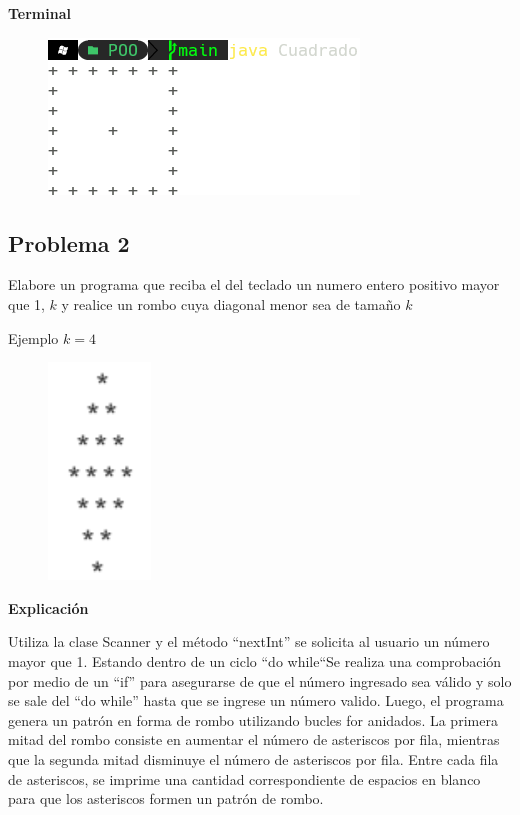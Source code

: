 \documentclass[11pt, twocolumn]{article}
\begin{document}
    \textbf{Terminal}
    \begin{figure}[ht]
        \includegraphics[width=0.75\columnwidth, center]{P1.png}
    \end{figure}


    \subsection*{Problema 2}
    Elabore un programa que reciba el del teclado un numero entero positivo mayor que 1, $k$ y realice un rombo cuya diagonal menor sea de tamaño $k$

    Ejemplo $k = 4$
    \begin{figure}[ht]
        \includegraphics[width=0.2\columnwidth, center]{Rombo.png}
    \end{figure}

    \textbf{Explicación} 

    Utiliza la clase Scanner y el método ``nextInt'' se solicita al usuario un número mayor que 1. Estando dentro de un ciclo ``do while``Se realiza una comprobación por medio de un ``if'' para asegurarse de que el número ingresado sea válido y solo se sale del ``do while'' hasta que se ingrese un número valido. Luego, el programa genera un patrón en forma de rombo utilizando bucles for anidados. La primera mitad del rombo consiste en aumentar el número de asteriscos por fila, mientras que la segunda mitad disminuye el número de asteriscos por fila. Entre cada fila de asteriscos, se imprime una cantidad correspondiente de espacios en blanco para que los asteriscos formen un patrón de rombo.
\end{document}
